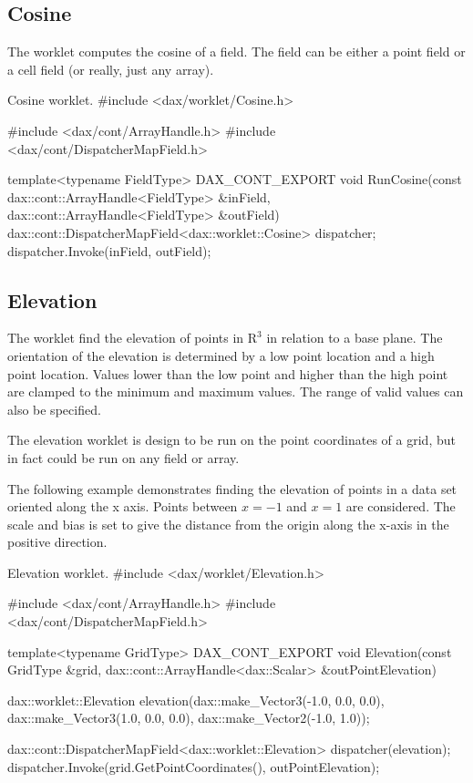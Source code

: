 \subsection{Cosine}

The  worklet computes the cosine of a field. The field
can be either a point field or a cell field (or really, just any array).

\begin{daxexample}{Cosine worklet.}
#include <dax/worklet/Cosine.h>

#include <dax/cont/ArrayHandle.h>
#include <dax/cont/DispatcherMapField.h>

template<typename FieldType>
DAX_CONT_EXPORT
void RunCosine(const dax::cont::ArrayHandle<FieldType> &inField,
               dax::cont::ArrayHandle<FieldType> &outField)
{
  dax::cont::DispatcherMapField<dax::worklet::Cosine> dispatcher;
  dispatcher.Invoke(inField, outField);
}
\end{daxexample}

\subsection{Elevation}

The  worklet find the elevation of points in
$\mathrm{R}^3$ in relation to a base plane. The orientation of the
elevation is determined by a low point location and a high point
location. Values lower than the low point and higher than the high point
are clamped to the minimum and maximum values. The range of valid values
can also be specified.

The elevation worklet is design to be run on the point coordinates of a
grid, but in fact could be run on any field or array.

The following example demonstrates finding the elevation of points in a
data set oriented along the x axis. Points between $x=-1$ and $x=1$ are
considered. The scale and bias is set to give the distance from the origin
along the x-axis in the positive direction.

\begin{daxexample}[ex:Elevation]{Elevation worklet.}
#include <dax/worklet/Elevation.h>

#include <dax/cont/ArrayHandle.h>
#include <dax/cont/DispatcherMapField.h>

template<typename GridType>
DAX_CONT_EXPORT
void Elevation(const GridType &grid,
               dax::cont::ArrayHandle<dax::Scalar> &outPointElevation)
{
  dax::worklet::Elevation elevation(dax::make_Vector3(-1.0, 0.0, 0.0),
                                    dax::make_Vector3(1.0, 0.0, 0.0),
                                    dax::make_Vector2(-1.0, 1.0));

  dax::cont::DispatcherMapField<dax::worklet::Elevation> dispatcher(elevation);
  dispatcher.Invoke(grid.GetPointCoordinates(), outPointElevation);
}
\end{daxexample}

